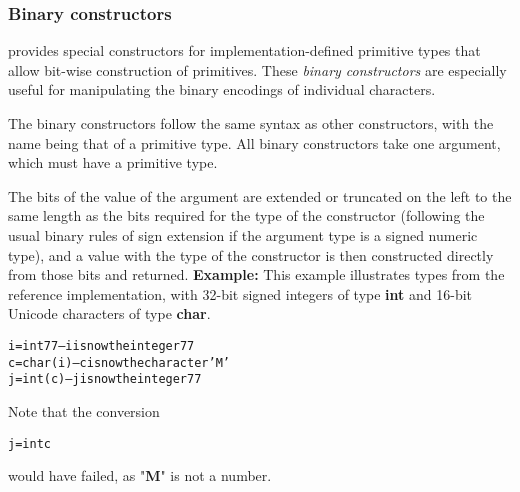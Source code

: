 \subsubsection{Binary constructors}\label{refbincon}
 
\nr{} provides special constructors for implementation-defined
primitive types that allow bit-wise construction of primitives.
These \emph{binary constructors} are especially useful for
manipulating the binary encodings of individual characters.
 
The binary constructors follow the same syntax as other constructors,
with the name being that of a primitive type.  All binary constructors
take one argument, which must have a primitive type.
 
The bits of the value of the argument are extended or truncated on the
left to the same length as the bits required for the type of the
constructor (following the usual binary rules of sign extension if the
argument type is a signed numeric type), and a value with the type of
the constructor is then constructed directly from those bits and
returned.
 \textbf{Example:}
 This example illustrates types from the reference implementation,
with 32-bit signed integers of type \textbf{int} and 16-bit Unicode
characters of type \textbf{char}.
\begin{alltt}
i=int 77   -- i is now the integer 77
c=char(i)  -- c is now the character 'M'
j=int(c)   -- j is now the integer 77
\end{alltt}
Note that the conversion
\begin{alltt}
j=int c
\end{alltt}
would have failed, as "\textbf{M}" is not a number.
